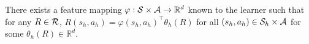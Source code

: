 


\begin{assumption}\label{assum: known feature}
    There exists a feature mapping $\varphi: \mathcal{S}\times\mathcal{A}\to \mathbb{R}^d$ known to the learner such that for any $R\in\mathcal{R}$, $R(s_h,a_h) = \varphi(s_h,a_h)^\top \theta_h(R)$ for all  $(s_h,a_h)\in\mathcal{S}_h\times \mathcal{A}$ for some $\theta_h(R)\in\mathbb{R}^d$.
\end{assumption}

